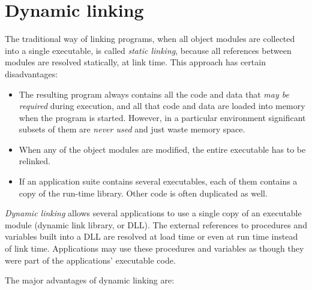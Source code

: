 \chapter{Dynamic linking}
\label{dll}

The traditional way of linking programs, when all object modules are
collected into a single executable, is called {\em static linking}, because
all references between modules are resolved statically, at link time.
This approach has certain disadvantages:

\begin{itemize}
\item The resulting program always contains all the code and data
      that {\em may be required} during execution, and all that code and
      data are loaded into memory when the program is started.
      However, in a particular environment significant subsets of them
      are {\em never used} and just waste memory space.
\item When any of the object modules are modified, the entire
      executable has to be relinked.
\item If an application suite contains several executables,
      each of them contains a copy of the run-time library.
      Other code is often duplicated as well.
\end{itemize}

{\em Dynamic linking} allows several applications to use a single copy
of an executable module (dynamic link library, or DLL). The external
references to procedures and variables built into a DLL are resolved
at load time or even at run time instead of link time.
Applications may use these procedures and variables as though
they were part of the applications' executable code.

The major advantages of dynamic linking are:

